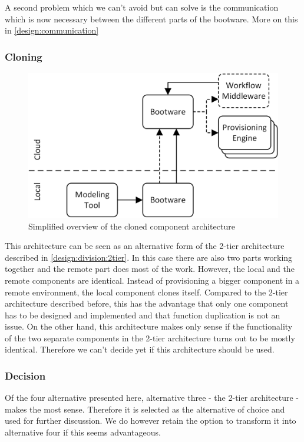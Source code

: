 A second problem which we can't avoid but can solve is the communication which is now necessary between the different parts of the bootware.
More on this in \autoref{design:communication}

\subsubsection{Cloning}

\begin{figure}[!htbp]
	\centering
	\includegraphics[resolution=600]{design/assets/simple_clone}
	\caption{Simplified overview of the cloned component architecture}
	\label{image:clone}
\end{figure}

This architecture can be seen as an alternative form of the 2-tier architecture described in \autoref{design:division:2tier}.
In this case there are also two parts working together and the remote part does most of the work.
However, the local and the remote components are identical.
Instead of provisioning a bigger component in a remote environment, the local component clones itself.
Compared to the 2-tier architecture described before, this has the advantage that only one component has to be designed and implemented and that function duplication is not an issue.
On the other hand, this architecture makes only sense if the functionality of the two separate components in the 2-tier architecture turns out to be mostly identical.
Therefore we can't decide yet if this architecture should be used.

\subsubsection{Decision}

Of the four alternative presented here, alternative three - the 2-tier architecture - makes the most sense.
Therefore it is selected as the alternative of choice and used for further discussion.
We do however retain the option to transform it into alternative four if this seems advantageous.

